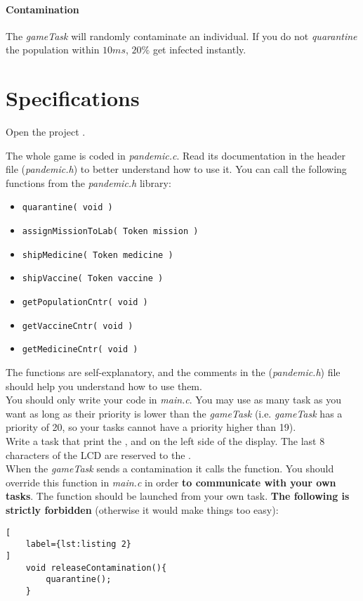 \paragraph{Contamination}
The \textit{gameTask} will randomly contaminate an individual.
If you do not \textit{quarantine} the population within $ 10ms $, $ 20\% $ get infected instantly.

\section*{Specifications}
Open the project .

The whole game is coded in \textit{pandemic.c}.
Read its documentation in the header file (\textit{pandemic.h}) to better understand how to use it. You can call the following functions from the \textit{pandemic.h} library: 
\begin{itemize}
	\item \texttt{quarantine( void )}
	\item \texttt{assignMissionToLab( Token mission )}
	\item \texttt{shipMedicine( Token medicine )}
	\item \texttt{shipVaccine( Token vaccine )}
	\item \texttt{getPopulationCntr( void )}
	\item \texttt{getVaccineCntr( void )}
	\item \texttt{getMedicineCntr( void )}
\end{itemize}
The functions are self-explanatory, and the comments in the (\textit{pandemic.h}) file should help you understand how to use them. 
\\

You should only write your code in \textit{main.c}.
You may use as many task as you want as long as their priority is lower than the \textit{gameTask} (i.e. \textit{gameTask} has a priority of 20, so your tasks cannot have a priority higher than 19).\\

Write a task that print the ,  and  on the left side of the display.
The last 8 characters of the LCD are reserved to the .\\

When the \textit{gameTask} sends a contamination it calls the  function.
You should override this function in \textit{main.c} in order \textbf{to communicate with your own tasks}.
The  function should be launched from your own task.
\textbf{The following is strictly forbidden} (otherwise it would make things too easy):
\begin{lstlisting}[
	label={lst:listing 2}
]
	void releaseContamination(){
	    quarantine();
	}
\end{lstlisting}


